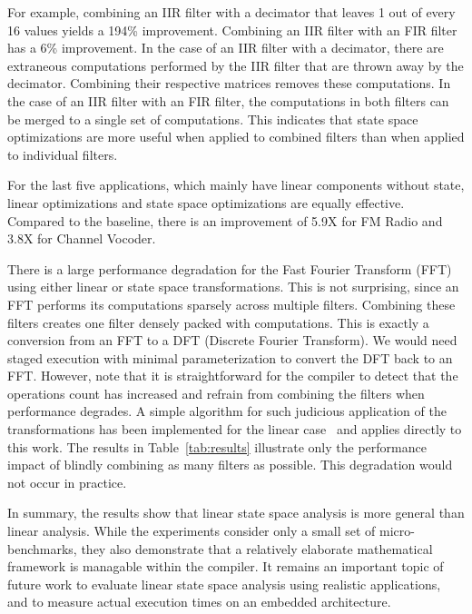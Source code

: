 For example, combining an IIR filter with a decimator that leaves 1
out of every 16 values yields a 194\% improvement. Combining an IIR
filter with an FIR filter has a 6\% improvement. In the case of an IIR
filter with a decimator, there are extraneous computations performed
by the IIR filter that are thrown away by the decimator.  Combining
their respective matrices removes these computations. In the case of
an IIR filter with an FIR filter, the computations in both filters can
be merged to a single set of computations. This indicates that state
space optimizations are more useful when applied to combined filters
than when applied to individual filters.

For the last five applications, which mainly have linear components
without state, linear optimizations and state space optimizations are
equally effective.  Compared to the baseline, there is an improvement
of 5.9X for FM Radio and 3.8X for Channel Vocoder.

There is a large performance degradation for the Fast Fourier
Transform (FFT) using either linear or state space transformations.
This is not surprising, since an FFT performs its computations
sparsely across multiple filters.  Combining these filters creates one
filter densely packed with computations.  This is exactly a conversion
from an FFT to a DFT (Discrete Fourier Transform).  We would need
staged execution with minimal parameterization to convert the DFT back
to an FFT.  However, note that it is straightforward for the compiler
to detect that the operations count has increased and refrain from
combining the filters when performance degrades.  A simple algorithm
for such judicious application of the transformations has been
implemented for the linear case~\cite{Lamb} and applies directly to
this work.  The results in Table~\ref{tab:results} illustrate only the
performance impact of blindly combining as many filters as possible.
This degradation would not occur in practice.

In summary, the results show that linear state space analysis is more
general than linear analysis.  While the experiments consider only a
small set of micro-benchmarks, they also demonstrate that a relatively
elaborate mathematical framework is managable within the compiler.  It
remains an important topic of future work to evaluate linear state
space analysis using realistic applications, and to measure actual
execution times on an embedded architecture.
